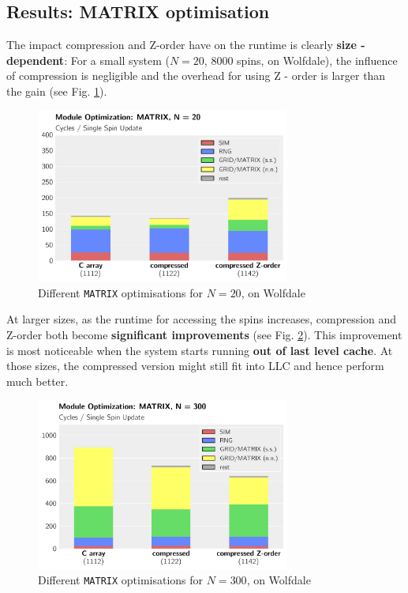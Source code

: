 \documentclass[letterpaper]{article}
\begin{document}
\subsection{Results: MATRIX optimisation}
The impact compression and Z-order have on the runtime is clearly \textbf{size - dependent}: For a small system ($N = 20$, $8000$ spins, on Wolfdale), the influence of compression is negligible and the overhead for using Z - order is larger than the gain (see Fig. \ref{MATRIX:Wolf:20}).
	\begin{figure}[h]\centering
	  \includegraphics[width = 8.36cm]{plots/msk_20_3.pdf}
	  \caption{Different \texttt{MATRIX} optimisations for $N = 20$, on Wolfdale}
	  \label{MATRIX:Wolf:20}
	\end{figure}\newline
At larger sizes, as the runtime for accessing the spins increases, compression and Z-order both become \textbf{significant improvements} (see Fig. \ref{MATRIX:Wolf:300}). This improvement is most noticeable when the system starts running \textbf{out of last level cache}. At those sizes, the compressed version might still fit into LLC and hence perform much better.
	\begin{figure}[h]\centering
	  \includegraphics[width = 8.36cm]{plots/msk_300_3.pdf}
	  \caption{Different \texttt{MATRIX} optimisations for $N = 300$, on Wolfdale}
	  \label{MATRIX:Wolf:300}
	\end{figure}\newline
\end{document}

